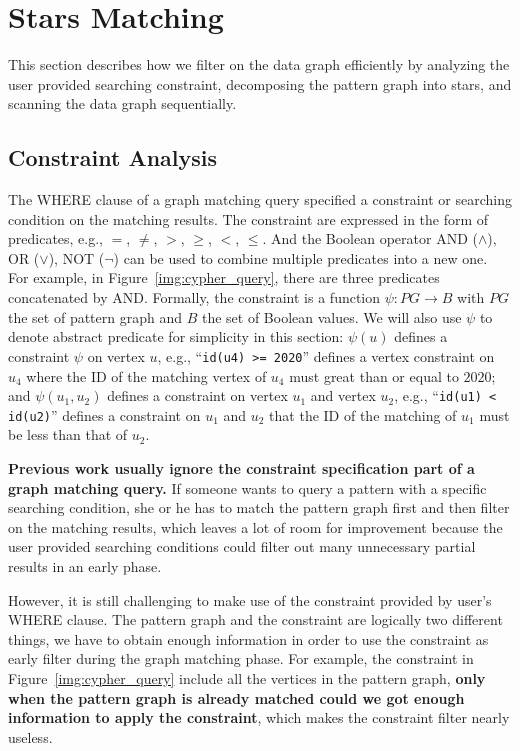 \section{Stars Matching}\label{sec:filter_on_data_graph}
This section describes how we filter on the data graph efficiently by analyzing the user provided searching constraint,
decomposing the pattern graph into stars, and scanning the data graph sequentially.
\subsection{Constraint Analysis}\label{sec:constraint_analysis}
The WHERE clause of a graph matching query specified a constraint or searching condition on the matching results.
The constraint are expressed in the form of predicates, e.g., $=$, $\neq$, $>$, $\ge$, $<$, $\le$.
And the Boolean operator AND ($\land$), OR ($\lor$), NOT ($\lnot$) can be used to combine multiple predicates into a new one.
For example, in Figure~\ref{img:cypher_query}, there are three predicates concatenated by AND\@.
Formally, the constraint is a function $\psi: PG \rightarrow B$ with $PG$ the set of pattern graph and $B$ the set of Boolean values.
We will also use $\psi$ to denote abstract predicate for simplicity in this section:
$\psi(u)$ defines a constraint $\psi$ on vertex $u$, e.g., ``\texttt{id(u4) >= 2020}'' defines a vertex constraint on $u_4$ where the ID of the matching vertex of $u_4$ must great than or equal to $2020$;
and $\psi(u_1, u_2)$ defines a constraint on vertex $u_1$ and vertex $u_2$,
e.g., ``\texttt{id(u1) < id(u2)}'' defines a constraint on $u_1$ and $u_2$ that the ID of the matching of $u_1$ must be less than that of $u_2$.

\textbf{Previous work usually ignore the constraint specification part of a graph matching query.}
If someone wants to query a pattern with a specific searching condition,
she or he has to match the pattern graph first and then filter on the matching results,
which leaves a lot of room for improvement because the user provided searching conditions could filter out many unnecessary
partial results in an early phase.

However, it is still challenging to make use of the constraint provided by user's WHERE clause.
The pattern graph and the constraint are logically two different things,
we have to obtain enough information in order to use the constraint as early filter during the graph matching phase.
For example, the constraint in Figure~\ref{img:cypher_query} include all the vertices in the pattern graph,
\textbf{only when the pattern graph is already matched could we got enough information to apply the constraint},
which makes the constraint filter nearly useless.

